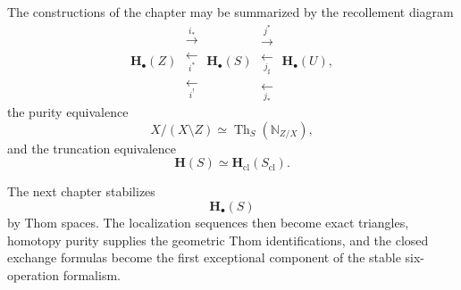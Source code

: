 The constructions of the chapter may be summarized by the recollement
diagram
\[
    \mathbf H_\bullet(Z)
    \;
    \substack{
        \xrightarrow{\ i_*\ }
        \\
        \xleftarrow[\ i^*\ ]{}
        \\
        \xleftarrow[\ i^!\ ]{}
    }
    \;
    \mathbf H_\bullet(S)
    \;
    \substack{
        \xrightarrow{\ j^*\ }
        \\
        \xleftarrow[\ j_\sharp\ ]{}
        \\
        \xleftarrow[\ j_*\ ]{}
    }
    \;
    \mathbf H_\bullet(U),
\]
the purity equivalence
\[
    X/(X\setminus Z)
    \simeq
    \operatorname{Th}_S(\mathbb N_{Z/X}),
\]
and the truncation equivalence
\[
    \mathbf H(S)
    \simeq
    \mathbf H_{\mathrm{cl}}(S_{\mathrm{cl}}).
\]

The next chapter stabilizes
\[
    \mathbf H_\bullet(S)
\]
by Thom spaces.  The localization sequences then become exact triangles,
homotopy purity supplies the geometric Thom identifications, and the
closed exchange formulas become the first exceptional component of the
stable six-operation formalism.

